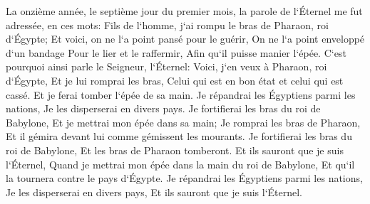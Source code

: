 \verse La onzième année, le septième jour du premier mois, la parole de l`Éternel me fut adressée, en ces mots: 
\verse Fils de l`homme, j`ai rompu le bras de Pharaon, roi d`Égypte; Et voici, on ne l`a point pansé pour le guérir, On ne l`a point enveloppé d`un bandage Pour le lier et le raffermir, Afin qu`il puisse manier l`épée. 
\verse C`est pourquoi ainsi parle le Seigneur, l`Éternel: Voici, j`en veux à Pharaon, roi d`Égypte, Et je lui romprai les bras, Celui qui est en bon état et celui qui est cassé. Et je ferai tomber l`épée de sa main. 
\verse Je répandrai les Égyptiens parmi les nations, Je les disperserai en divers pays. 
\verse Je fortifierai les bras du roi de Babylone, Et je mettrai mon épée dans sa main; Je romprai les bras de Pharaon, Et il gémira devant lui comme gémissent les mourants. 
\verse Je fortifierai les bras du roi de Babylone, Et les bras de Pharaon tomberont. Et ils sauront que je suis l`Éternel, Quand je mettrai mon épée dans la main du roi de Babylone, Et qu`il la tournera contre le pays d`Égypte. 
\verse Je répandrai les Égyptiens parmi les nations, Je les disperserai en divers pays, Et ils sauront que je suis l`Éternel. 

\chapter{}

